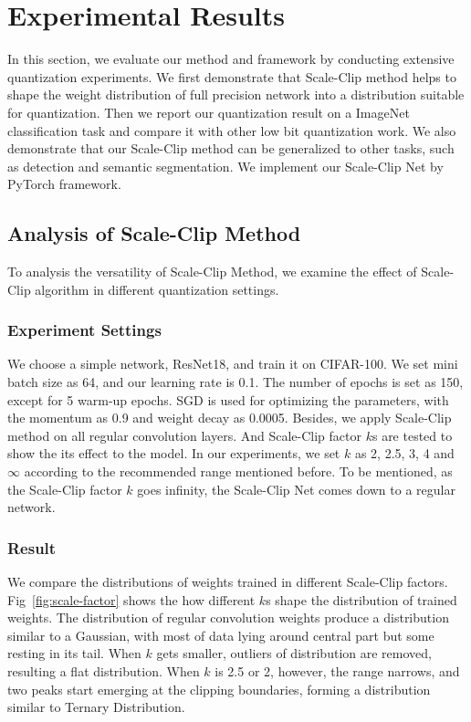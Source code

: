 \documentclass[letterpaper]{article} %
\begin{document}
\section{Experimental Results}
In this section, we evaluate our method and framework by conducting extensive quantization experiments. We first demonstrate that Scale-Clip method helps to shape the weight distribution of full precision network into a distribution suitable for quantization. Then we report our quantization result on a ImageNet classification task and compare it with other low bit quantization work. We also demonstrate that our Scale-Clip method can be generalized to other tasks, such as detection and semantic segmentation. We implement our Scale-Clip Net by PyTorch framework.
\subsection{Analysis of Scale-Clip Method}\label{an illustrating example}
To analysis the versatility of Scale-Clip Method, we examine the effect of Scale-Clip algorithm in different quantization settings.

\subsubsection{Experiment Settings}
We choose a simple network, ResNet18, and train it on CIFAR-100. We set mini batch size as 64, and our learning rate is 0.1. The number of epochs is set as 150, except for 5 warm-up epochs. SGD is used for optimizing the parameters, with the momentum as 0.9 and weight decay as 0.0005. Besides, we apply Scale-Clip method on all regular convolution layers. And Scale-Clip factor $k$s are tested to show the its effect to the model. In our experiments,  we set $k$ as 2, 2.5, 3, 4 and $\infty$ according to the recommended range mentioned before. To be mentioned, as the Scale-Clip factor $k$ goes infinity, the Scale-Clip Net comes down to a regular network.

\subsubsection{Result} We compare the distributions of weights trained in different Scale-Clip factors. Fig~\ref{fig:scale-factor} shows the how different $k$s shape the distribution of trained weights. The distribution of regular convolution weights produce a distribution similar to a Gaussian, with most of data lying around central part but some resting in its tail. When $k$ gets smaller, outliers of distribution are removed, resulting a flat distribution. When $k$ is 2.5 or 2, however, the range narrows, and two peaks start emerging at the clipping boundaries, forming a distribution similar to Ternary Distribution.  
\end{document}
